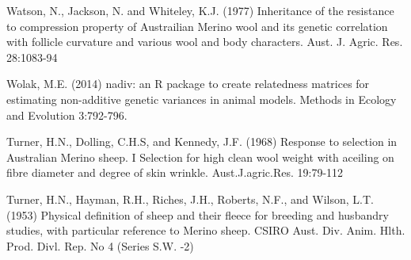 \documentclass[titlepage]{article}  %
\begin{document}
\begin{thebibliography}{99}
Watson, N., Jackson, N. and Whiteley, K.J. (1977) Inheritance of the resistance
    to compression property of Austrailian Merino wool and its genetic 
    correlation with follicle curvature and various wool and body 
    characters. Aust. J. Agric. Res. 28:1083-94

Wolak, M.E. (2014) nadiv: an R package to create relatedness matrices for
    estimating non-additive genetic variances in animal models.
    Methods in Ecology and Evolution 3:792-796.

Turner, H.N., Dolling, C.H.S, and Kennedy, J.F. (1968) Response to selection in Australian Merino sheep. I Selection for high clean wool weight with aceiling on fibre diameter and degree of skin wrinkle. Aust.J.agric.Res. 19:79-112

Turner, H.N., Hayman, R.H., Riches, J.H., Roberts, N.F., and Wilson, L.T. (1953) Physical definition of sheep and their fleece for breeding and husbandry studies, with particular reference to Merino sheep. CSIRO Aust. Div. Anim. Hlth. Prod. Divl. Rep. No 4 (Series S.W. -2)

\end{thebibliography}
\end{document}
